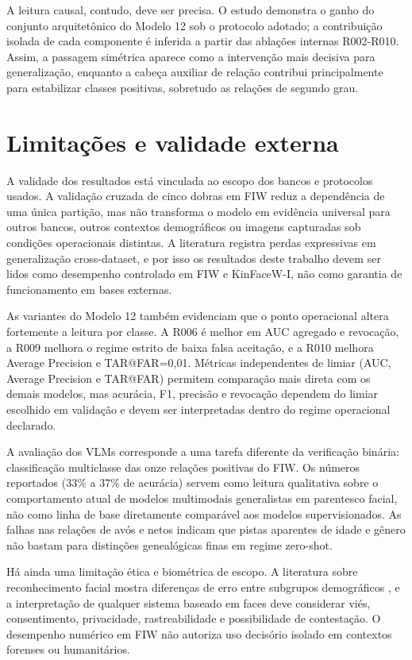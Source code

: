 A leitura causal, contudo, deve ser precisa. O estudo demonstra o ganho do conjunto arquitetônico do Modelo 12 sob o protocolo adotado; a contribuição isolada de cada componente é inferida a partir das ablações internas R002-R010. Assim, a passagem simétrica aparece como a intervenção mais decisiva para generalização, enquanto a cabeça auxiliar de relação contribui principalmente para estabilizar classes positivas, sobretudo as relações de segundo grau.

\section{Limitações e validade externa}

A validade dos resultados está vinculada ao escopo dos bancos e protocolos usados. A validação cruzada de cinco dobras em FIW reduz a dependência de uma única partição, mas não transforma o modelo em evidência universal para outros bancos, outros contextos demográficos ou imagens capturadas sob condições operacionais distintas. A literatura registra perdas expressivas em generalização cross-dataset, e por isso os resultados deste trabalho devem ser lidos como desempenho controlado em FIW e KinFaceW-I, não como garantia de funcionamento em bases externas.

As variantes do Modelo 12 também evidenciam que o ponto operacional altera fortemente a leitura por classe. A R006 é melhor em AUC agregado e revocação, a R009 melhora o regime estrito de baixa falsa aceitação, e a R010 melhora Average Precision e TAR@FAR=0,01. Métricas independentes de limiar (AUC, Average Precision e TAR@FAR) permitem comparação mais direta com os demais modelos, mas acurácia, F1, precisão e revocação dependem do limiar escolhido em validação e devem ser interpretadas dentro do regime operacional declarado.

A avaliação dos VLMs corresponde a uma tarefa diferente da verificação binária: classificação multiclasse das onze relações positivas do FIW. Os números reportados (33\% a 37\% de acurácia) servem como leitura qualitativa sobre o comportamento atual de modelos multimodais generalistas em parentesco facial, não como linha de base diretamente comparável aos modelos supervisionados. As falhas nas relações de avós e netos indicam que pistas aparentes de idade e gênero não bastam para distinções genealógicas finas em regime zero-shot.

Há ainda uma limitação ética e biométrica de escopo. A literatura sobre reconhecimento facial mostra diferenças de erro entre subgrupos demográficos \cite{buolamwini2018gender}, e a interpretação de qualquer sistema baseado em faces deve considerar viés, consentimento, privacidade, rastreabilidade e possibilidade de contestação. O desempenho numérico em FIW não autoriza uso decisório isolado em contextos forenses ou humanitários.

